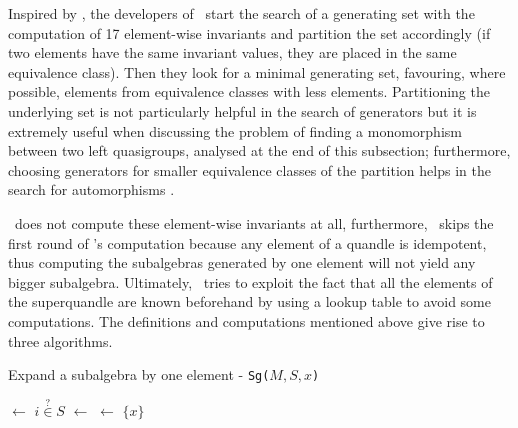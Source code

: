Inspired by \cite{nagy2007loops}, the developers of \cream~start the search of a generating set with the computation of 17 element-wise invariants and partition the set accordingly (if two elements have the same invariant values, they are placed in the same equivalence class). Then they look for a minimal generating set, favouring, where possible, elements from equivalence classes with less elements. Partitioning the underlying set is not particularly helpful in the search of generators but it is extremely useful when discussing the problem of finding a monomorphism between two left quasigroups, analysed at the end of this subsection; furthermore, choosing generators for smaller equivalence classes of the partition helps in the search for automorphisms \cite{Araujo2022CREAMAP}.

\Software~does not compute these element-wise invariants at all, furthermore, \Software~skips the first round of \cream's computation because any element of a quandle is idempotent, thus computing the subalgebras generated by one element will not yield any bigger subalgebra. Ultimately, \Software~tries to exploit the fact that all the elements of the superquandle are known beforehand by using a lookup table to avoid some computations.
The definitions and computations mentioned above give rise to three algorithms.\newline\newline
\begin{algorithm}[H]
\label{subElement}
\DontPrintSemicolon
\caption{Expand a subalgebra by one element - \texttt{Sg($M,S,x$)}}

\BlankLine
\BlankLine
{} $\leftarrow$ $i \overset{?}{\in} S$\;
 $\leftarrow$ \true\;
\toAdd $\leftarrow$ $\{x\}$\;

\end{algorithm}
